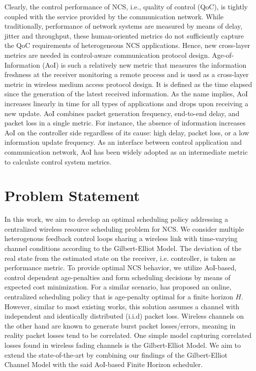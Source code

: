 Clearly, the control performance of NCS, i.e., quality of control (QoC), is
tightly coupled with the service provided by the communication network. While
traditionally, performance of network systems are measured by means of delay,
jitter and throughput, these human-oriented metrics do not sufficiently capture
the QoC requirements of heterogeneous NCS applications. Hence, new cross-layer
metrics are needed in control-aware communication protocol design.
Age-of-Information (AoI) is such a relatively new metric that measures the
information freshness at the receiver monitoring a remote process
\cite{kaul2012real} and is used as a cross-layer metric in wireless medium
access protocol design. It is defined as the time elapsed since the generation
of the latest received information. As the name implies, AoI increases linearly
in time for all types of applications and drops upon receiving a new update. AoI
combines packet generation frequency, end-to-end delay, and packet loss in a
single metric. For instance, the absence of information increases AoI on the
controller side regardless of its cause: high delay, packet loss, or a low
information update frequency. As an interface between control application and
communication network, AoI has been widely adopted as an intermediate metric to
calculate control system metrics. 


\section*{Problem Statement}
In this work, we aim to develop an optimal scheduling policy addressing a
centralized wireless resource scheduling problem for NCS. We consider multiple
heterogenous feedback control loops sharing a wireless link with time-varying
channel conditions according to the Gilbert-Elliot Model. The deviation of the
real state from the estimated state on the receiver, i.e. controller, is taken
as performance metric. To provide optimal NCS behavior, we utilize AoI-based,
control dependent age-penalties and form scheduling decisions by means of
expected cost minimization. For a similar scenario, \cite{ayan2020aoi} has
proposed an online, centralized scheduling policy that is age-penalty optimal
for a finite horizon $H$. However, similar to most existing works, this solution
assumes a channel with independent and identically distributed (i.i.d) packet
loss. Wireless channels on the other hand are known to generate burst packet
losses/errors, meaning in reality packet losses tend to be correlated. One
simple model capturing correlated losses found in wireless fading channels is
the Gilbert-Elliot Model. We aim to extend the state-of-the-art by combining our
findings of the Gilbert-Elliot Channel Model with the said AoI-based Finite
Horizon scheduler.

